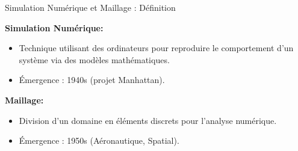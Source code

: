 \begin{frame}{Simulation Numérique et Maillage : Définition}
  
    \textbf{Simulation Numérique:}
    \begin{itemize}
      \item Technique utilisant des ordinateurs pour reproduire le comportement d'un système via des modèles mathématiques.
      \item Émergence : 1940s (projet Manhattan).
    \end{itemize}
    
    \pause
    \vspace*{.3cm}
    \textbf{Maillage:}
    \begin{itemize}
      \item Division d'un domaine en éléments discrets pour l'analyse numérique.
      \item Émergence : 1950s (Aéronautique, Spatial).
    \end{itemize}
  
\end{frame}

